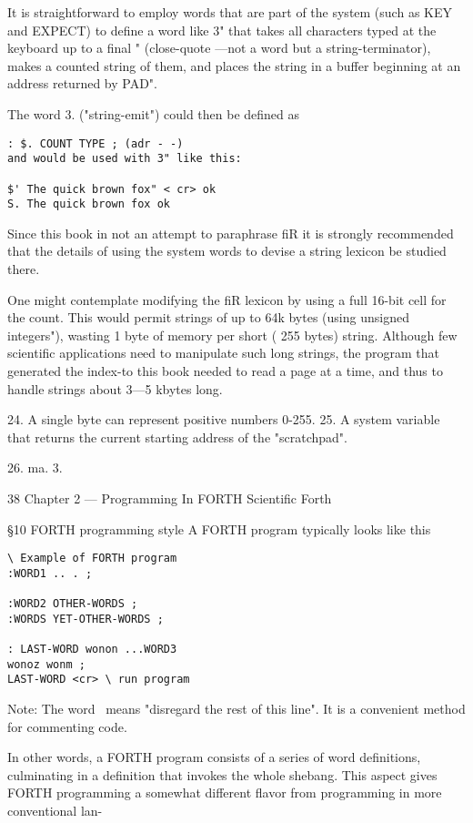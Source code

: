 It is straightforward to employ words that are part of the system
(such as KEY and EXPECT) to define a word like 3" that takes
all characters typed at the keyboard up to a final " (close-quote
—not a word but a string-terminator), makes a counted string of
them, and places the string in a buffer beginning at an address
returned by PAD".

The word 3. ("string-emit") could then be defined as
\begin{lstlisting}
: $. COUNT TYPE ; (adr - -)
and would be used with 3" like this:

$' The quick brown fox" < cr> ok
S. The quick brown fox ok
\end{lstlisting}

Since this book in not an attempt to paraphrase fiR it is strongly
recommended that the details of using the system words to devise
a string lexicon be studied there.

One might contemplate modifying the fiR lexicon by using a
full 16-bit cell for the count. This would permit strings of up to
64k bytes (using unsigned integers"), wasting 1 byte of memory
per short ( 255 bytes) string. Although few scientific applications
need to manipulate such long strings, the program that generated
the index-to this book needed to read a page at a time, and thus
to handle strings about 3—5 kbytes long.

 

24. A single byte can represent positive numbers 0-255.
25. A system variable that returns the current starting address of the "scratchpad".

26. ma. 3.

38 Chapter 2 — Programming In FORTH Scientific Forth

§10 FORTH programming style
A FORTH program typically looks like this

\begin{lstlisting}
\ Example of FORTH program
:WORD1 .. . ;

:WORD2 OTHER-WORDS ;
:WORDS YET-OTHER-WORDS ;

: LAST-WORD wonon ...WORD3
wonoz wonm ;
LAST-WORD <cr> \ run program
\end{lstlisting}

Note: The word \ means "disregard the rest of this line". It is a
convenient method for commenting code.

In other words, a FORTH program consists of a series of word
definitions, culminating in a definition that invokes the whole
shebang. This aspect gives FORTH programming a somewhat
different ﬂavor from programming in more conventional lan-

